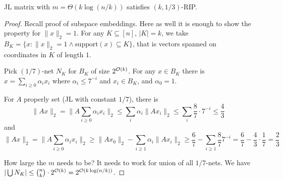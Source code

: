 \documentclass[11pt]{article}
\begin{document}
\begin{theorem}
JL matrix with $m = \Theta(k \log(n/k))$ satisfies $(k,1/3)$-RIP.
\end{theorem}
\begin{proof}
Recall proof of subspace embeddings. Here as well it is enough to show the property for $\|x\|_2 = 1$. For any $K \subseteq [n]$, $|K| = k$, we take $B_K = \{ x : \|x\|_2 = 1 \wedge \textrm{support}(x) \subseteq K \}$, that is vectors spanned on coordinates in $K$ of length $1$.

Pick $(1/7)$-net $N_K$ for $B_K$ of size $2^{\mathcal{O}(k)}$. For any $x \in B_K$ there is
$x = \sum_{i\ge0} \alpha_i x_i $ where $\alpha_i \le 7^{-i}$ and $x_i \in B_K$, and $\alpha_0 = 1$.

For $A$ properly set (JL with constant $1/7$), there is
$$\|Ax\|_2 = \|A \sum_{i\ge0} \alpha_i x_i\|_2 \le \sum_i \alpha_i \|A x_i\|_2 \le \sum_i \frac{8}{7} \cdot 7^{-i} \le \frac{4}{3}$$
and
$$\|Ax\|_2 = \|A \sum_{i\ge0} \alpha_i x_i\|_2 \ge \|A x_0\|_2 - \sum_{i\ge1} \alpha_i \|A x_i\|_2  \ge \frac{6}{7} - \sum_{i\ge1} \frac{8}{7} 7^{-i} = \frac{6}{7} - \frac{4}{3} \cdot \frac{1}{7} = \frac23$$

How large the $m$ needs to be? It needs to work for union of all $1/7$-nets. We have $|\bigcup N_K| \le {n \choose k} \cdot 2^{\mathcal{O}(k)} = 2^{\mathcal{O}(k \log(n/k))}$.
\end{proof}
\end{document}
